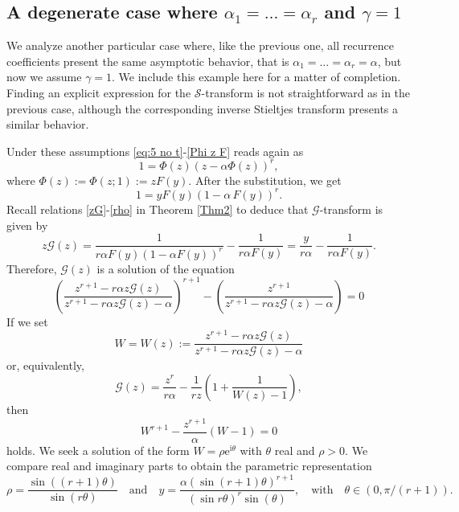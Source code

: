 \documentclass[12pt]{article}
\newcommand{\ii}{\mathrm{i}}
\newcommand{\e}{\mathrm{e}}
\newcommand{\St}{\mathcal{S}} %
\newcommand{\Gt}{\mathcal{G}} %
\numberwithin{equation}{section}
\begin{document}

\subsection{A degenerate case where \texorpdfstring{$\alpha_1=\ldots =\alpha_r$}{alpha1=...=alphar} and \texorpdfstring{$\gamma =1$}{gamma=1}}

We analyze another particular case where, like the previous one, all recurrence coefficients present the same asymptotic behavior, that is $\alpha_1=\ldots = \alpha_r=\alpha$, but now we assume $\gamma=1$. We include this example here for a matter of completion. Finding an explicit expression for the \(\St\)-transform is not straightforward as in the previous case, although the corresponding inverse Stieltjes transform presents a similar behavior.

Under these assumptions \eqref{eq:5 no t}-\eqref{Phi z F} reads again as 
\[
	1= \Phi(z) \left( z-\alpha\Phi(z)\right)^r ,
\]
where $\Phi(z):=\Phi(z;1) :=z F(y)$. 
After the substitution, we get 
\[1= y F(y)  \left( 1-\alpha \, F(y)\right)^r .\]
Recall relations \eqref{zG}-\eqref{rho} in Theorem \ref{Thm2} to deduce that \(\Gt\)-transform is given by 
\begin{equation*}\label{zG case1}
	z\Gt(z) = \frac{1}{r\alpha F(y) \left( 1-\alpha F(y)\right)^r } - \frac{1}{r\alpha F(y)}      
		= \frac{y}{r\alpha} - \frac{1}{r\alpha F(y)}.
\end{equation*}
Therefore, \(\Gt(z)\) is a solution of the equation 
\[
	\left(\frac{z^{r+1}-r\alpha z\Gt(z)}{ z^{r+1}-r\alpha z\Gt(z)-\alpha}\right)^{r+1}
	-  \left(\frac{z^{r+1}}{ z^{r+1}-r\alpha z\Gt(z)-\alpha }\right) =0
\]
If we set   
\[  W = W(z):=\frac{z^{r+1}-r\alpha z\Gt(z)}{ z^{r+1}-r\alpha z\Gt(z)-\alpha}
\]
or, equivalently, 
 \[
    \Gt(z)
 =
 \frac{z^{r}}{r\alpha}- \frac{1}{rz} \left(1+\frac{1}{W(z)-1} \right) ,
 \]
then 
\[
	 {W }^{r+1} - \frac{z^{r+1}}{\alpha}\left( W-1\right) =0
\]
holds. We seek a solution of the form \(W=\rho \e^{\ii \theta}\) with \(\theta\) real and \(\rho>0\). We compare real and imaginary parts to obtain the parametric representation 
\[
	\rho = \frac{ \sin( (r+1)\theta) }{\sin( r\theta)}
	\quad \text{and}\quad 
	y=  \frac{\alpha (\sin (r+1)\theta)^{r+1} }{  (\sin r\theta)^{r} \sin(\theta)}, \quad \text{with} \quad \theta\in (0,\pi/(r+1)). 
\]
\end{document}
